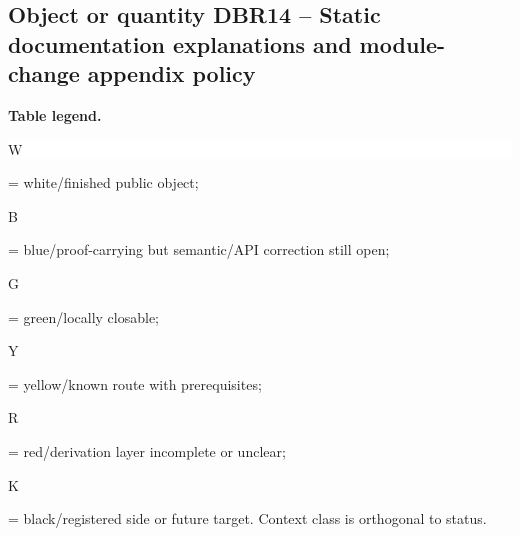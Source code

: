 \subsection*{Object or quantity DBR14 -- Static documentation explanations and module-change appendix policy}
\hypertarget{objproof:DBR14}{}
\par\smallskip\noindent\begin{minipage}{0.99\linewidth}\footnotesize\raggedright\textbf{Table legend.} \colorbox{white}{\strut W} = white/finished public object; \colorbox{cyan!20}{\strut B} = blue/proof-carrying but semantic/API correction still open; \colorbox{green!18}{\strut G} = green/locally closable; \colorbox{yellow!25}{\strut Y} = yellow/known route with prerequisites; \colorbox{red!20}{\strut R} = red/derivation layer incomplete or unclear; \colorbox{black!18}{\strut K} = black/registered side or future target. Context class is orthogonal to status.\end{minipage}\par\vspace{0.25em}
